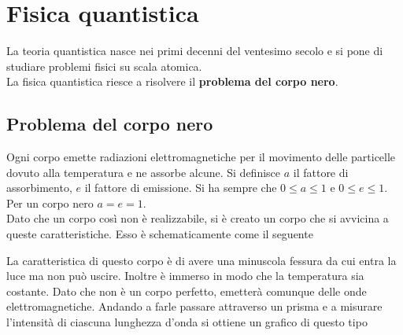 
\section{Fisica quantistica}
La teoria quantistica nasce nei primi decenni del ventesimo secolo e si pone di studiare problemi
fisici su scala atomica.\\
La fisica quantistica riesce a risolvere il \textbf{problema del corpo nero}.

\subsection{Problema del corpo nero}
Ogni corpo emette radiazioni elettromagnetiche per il movimento delle particelle dovuto alla 
temperatura e ne assorbe alcune. Si definisce $a$ il fattore di assorbimento, $e$ il fattore di 
emissione. Si ha sempre che $0\leq a\leq1$ e $0\leq e\leq1$. Per un corpo nero $a=e=1$.\\
Dato che un corpo così non è realizzabile, si è creato un corpo che si avvicina a queste 
caratteristiche. Esso è schematicamente come il seguente
\begin{center}
\end{center}
La caratteristica di questo corpo è di avere una minuscola fessura da cui entra la luce ma non può
uscire. Inoltre è immerso in modo che la temperatura sia costante. Dato che non è un corpo perfetto,
emetterà comunque delle onde elettromagnetiche. Andando a farle passare attraverso un prisma e a
misurare l'intensità di ciascuna lunghezza d'onda si ottiene un grafico di questo tipo
\begin{center}
\end{center}
